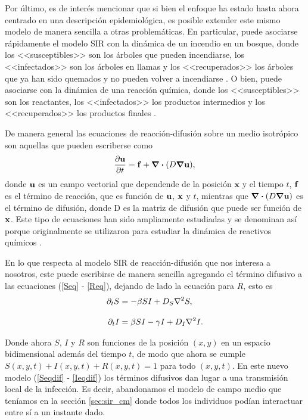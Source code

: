 Por último, es de interés mencionar que si bien el enfoque ha estado hasta ahora centrado en una descripción epidemiológica, es posible extender este 
mismo modelo de manera sencilla a otras problemáticas. En particular, puede asociarse rápidamente el modelo SIR con la dinámica
de un incendio en un bosque, donde los <<susceptibles>> son los árboles que pueden incendiarse, los <<infectados>> son los árboles en 
llamas y los <<recuperados>> los árboles que ya han sido quemados y no pueden volver a incendiarse \cite{provatas1995flame,PhysRevE.96.013107,PhysRevLett.79.1515,provatas1995scaling}. O bien, puede asociarse con la dinámica de una 
reacción química, donde los <<susceptibles>> son los reactantes, los <<infectados>> los productos intermedios y los <<recuperados>> los productos finales \cite{ipsen2000amplitude,field1985oscillations,horvath1993instabilities}.
 


De manera general las ecuaciones de reacción-difusión sobre un medio isotrópico son aquellas que pueden escriberse como
\begin{equation}
  \pdv{\vb{u}}{t} = \vb{f} + \div(D\grad{\vb{u}}),
\end{equation}
donde $\vb{u}$ es un campo vectorial que dependende de la posición $\mathbf{x}$ y el tiempo $t$, $\vb{f}$ es el término de reacción, que es función de 
$\vb u$, $\vb x$ y $t$, mientras que $\div(D\grad{\vb{u}})$ es el término de difusión, donde D es la matriz de difusión que puede ser función de $\vb x$.
Este tipo de ecuaciones han sido ampliamente estudiadas \cite{keeling:infectious_diseases,Murray2002,Murray2003,crank1979mathematics} y se denominan así porque originalmente 
se utilizaron para estudiar la dinámica de reactivos químicos \cite{turing52the}.

En lo que respecta al modelo SIR de reacción-difusión que nos interesa a nosotros, este puede escribirse de manera sencilla agregando 
el término difusivo a las ecuaciones (\ref{Seq} - \ref{Req}), dejando de lado la ecuación para $R$, esto es 
\begin{align}
  \partial_t S &=-\beta SI + D_{S} \laplacian{S},\label{Seqdif}\\[.3cm]
  \partial_t I &=\beta SI - \gamma I + D_{I} \laplacian{I}.\label{Ieqdif}
\end{align}

Donde ahora $S$, $I$ y $R$ son funciones de la posición $(x,y)$ en un espacio bidimensional además del tiempo $t$, de modo que ahora 
se cumple $S(x,y,t)+I(x,y,t)+R(x,y,t)=1$ para todo $(x,y,t)$. En este nuevo modelo 
(\ref{Seqdif} - \ref{Ieqdif}) los términos difusivos dan lugar a una transmisión local de la infección. Es decir, abandonamos 
el modelo de campo medio que teníamos en la sección \ref{sec:sir_cm} donde todos los individuos podían interactuar entre sí a un instante dado.

